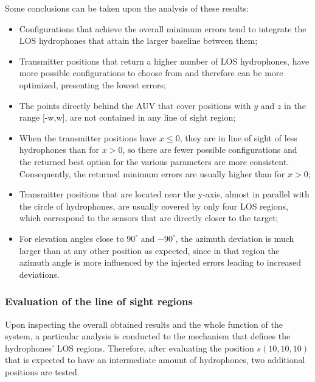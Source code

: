 Some conclusions can be taken upon the analysis of these results: 
\begin{itemize}
	\item Configurations that achieve the overall minimum errors tend to integrate the LOS hydrophones that attain the larger baseline between them;
	
	\item Transmitter positions that return a higher number of LOS hydrophones, have more possible configurations to choose from and therefore can be more optimized, presenting the lowest errors;
		
	\item The points directly behind the AUV that cover positions with $y$ and $z$ in the range [-w,w], are not contained in any line of sight region;
	
	\item When the transmitter positions have $x \leq 0$, they are in line of sight of less hydrophones than for $x > 0$, so there are fewer possible configurations and the returned best option for the various parameters are more consistent. Consequently, the returned minimum errors are usually higher than for $x > 0$;
	
	\item Transmitter positions that are located near the y-axis, almost in parallel with the circle of hydrophones, are usually covered by only four LOS regions, which correspond to the sensors that are directly closer to the target;
	
	\item For elevation angles close to $90^{\circ}$ and $-90^{\circ}$, the azimuth deviation is much larger than at any other position as expected, since in that region the azimuth angle is more influenced by the injected errors leading to increased deviations.
\end{itemize}

\subsubsection{ Evaluation of the line of sight regions}	

Upon inspecting the overall obtained results and the whole function of the system, a particular analysis is conducted to the mechanism that defines the hydrophones' LOS regions. Therefore, after evaluating the position $s(10,10,10)$ that is expected to have an intermediate amount of hydrophones, two additional positions are tested.

